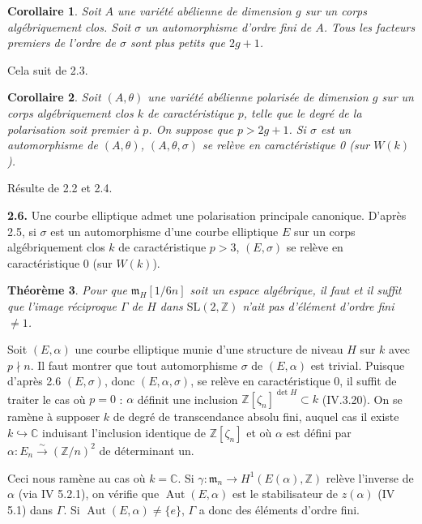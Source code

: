 \documentclass[10pt,a4paper]{amsart}
\theoremstyle{plain}
\newtheorem{theorem}{Th\'eor\`eme}[section]
\newtheorem{corollary}[theorem]{Corollaire}
\theoremstyle{definition}
\DeclareMathOperator{\Aut}{Aut}
\newcommand{\m}{\mathfrak{m}}
\newcommand{\ZZ}{\mathbb{Z}}
\newcommand{\CC}{\mathbb{C}}
\newcommand{\SL}{\mathrm{SL}}
\begin{document}
\begin{corollary}
Soit $A$ une vari\'et\'e ab\'elienne de dimension $g$ sur un corps alg\'ebriquement clos. Soit $\sigma$ un automorphisme d'ordre fini de $A$. Tous les facteurs premiers de l'ordre de $\sigma$ sont plus petits que $2g+1$.
\end{corollary}

Cela suit de 2.3.

\begin{corollary}
Soit $(A,\theta)$ une vari\'et\'e ab\'elienne polaris\'ee de dimension $g$ sur un corps alg\'ebriquement clos $k$ de caract\'eristique $p$, telle que le degr\'e de la polarisation soit premier \`a $p$. On suppose que $p > 2g+1$. Si $\sigma$ est un automorphisme de $(A,\theta)$, $(A,\theta,\sigma)$ se rel\`eve en caract\'eristique 0 (sur $W(k)$).
\end{corollary}

R\'esulte de 2.2 et 2.4.

\medskip\noindent\textbf{2.6.} Une courbe elliptique admet une polarisation principale canonique. D'apr\`es 2.5, si $\sigma$ est un automorphisme d'une courbe elliptique $E$ sur un corps alg\'ebriquement clos $k$ de caract\'eristique $p > 3$, $(E,\sigma)$ se rel\`eve en caract\'eristique 0 (sur $W(k)$).

\setcounter{theorem}{6}
\begin{theorem}
Pour que $\m_H[1/6n]$ soit un espace alg\'ebrique, il faut et il suffit que l'image r\'eciproque $\Gamma$ de $H$ dans $\SL(2,\ZZ)$ n'ait pas d'\'el\'ement d'ordre fini $\not= 1$.
\end{theorem}

Soit $(E,\alpha)$ une courbe elliptique munie d'une structure de niveau $H$ sur $k$ avec $p \nmid n$. Il faut montrer que tout automorphisme $\sigma$ de $(E,\alpha)$ est trivial. Puisque d'apr\`es 2.6 $(E,\sigma)$, donc $(E,\alpha,\sigma)$, se rel\`eve en caract\'eristique 0, il suffit de traiter le cas o\`u $p = 0$ : $\alpha$ d\'efinit une inclusion $\ZZ[\zeta_n]^{\det H} \subset k$ (IV.3.20). On se ram\`ene \`a supposer $k$ de degr\'e de transcendance absolu fini, auquel cas il existe $k \hookrightarrow \CC$ induisant l'inclusion identique de $\ZZ[\zeta_n]$ et o\`u $\alpha$ est d\'efini par $\alpha : E_n \xrightarrow{\sim} (\ZZ/n)^2$ de d\'eterminant un.

Ceci nous ram\`ene au cas o\`u $k = \CC$. Si $\gamma : \m_n \to H^1(E(\alpha), \ZZ)$ rel\`eve l'inverse de $\alpha$ (via IV 5.2.1), on v\'erifie que $\Aut(E,\alpha)$ est le stabilisateur de $z(\alpha)$ (IV 5.1) dans $\Gamma$. Si $\Aut(E,\alpha) \not= \{e\}$, $\Gamma$ a donc des \'el\'ements d'ordre fini.
\end{document}
